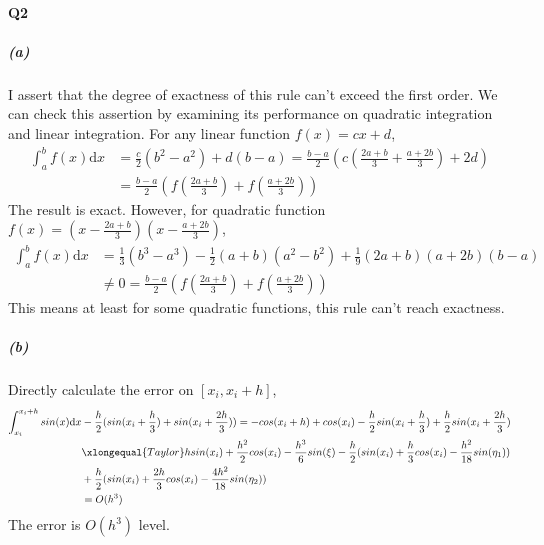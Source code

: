 \documentclass[11pt]{article}
\begin{document}
\paragraph{Q2}
\subparagraph{(a)}
I assert that the degree of exactness of this rule can't exceed the first order. We can check this assertion by examining its performance on quadratic integration and linear integration. For any linear function $f(x)=cx+d$,
\begin{align}
	\int_{a}^{b}f(x)\mathrm{d}x&=\frac{c}{2}(b^2-a^2)+d(b-a)=\frac{b-a}{2}(c(\frac{2a+b}{3}+\frac{a+2b}{3})+2d)\\&=\frac{b-a}{2}(f(\frac{2a+b}{3})+f(\frac{a+2b}{3}))
\end{align} 
The result is exact. However, for quadratic function $f(x)=(x-\frac{2a+b}{3})(x-\frac{a+2b}{3})$,
\begin{align}
	\int_{a}^{b}f(x)\mathrm{d}x&=\frac{1}{3}(b^3-a^3)-\frac{1}{2}(a+b)(a^2-b^2)+\frac{1}{9}(2a+b)(a+2b)(b-a)\\&\ne0=\frac{b-a}{2}(f(\frac{2a+b}{3})+f(\frac{a+2b}{3}))
\end{align}
This means at least for some quadratic functions, this rule can't reach exactness.
\subparagraph{(b)}
Directly calculate the error on $[x_i,x_i+h]$,
\begin{align}
	\int_{x_i}^{x_i+h}sin(x)\mathrm{d}x&-\frac{h}{2}(sin(x_i+\frac{h}{3})+sin(x_i+\frac{2h}{3}))=-cos(x_i+h)+cos(x_i)-\frac{h}{2}sin(x_i+\frac{h}{3})+\frac{h}{2}sin(x_i+\frac{2h}{3})\\
	&\xlongequal{Taylor}hsin(x_i)+\frac{h^2}{2}cos(x_i)-\frac{h^3}{6}sin(\xi)-\frac{h}{2}(sin(x_i)+\frac{h}{3}cos(x_i)-\frac{h^2}{18}sin(\eta_1))\\
	&+\frac{h}{2}(sin(x_i)+\frac{2h}{3}cos(x_i)-\frac{4h^2}{18}sin(\eta_2))\\
	&=O(h^3)
\end{align}
The error is $O(h^3)$ level.
\end{document}
